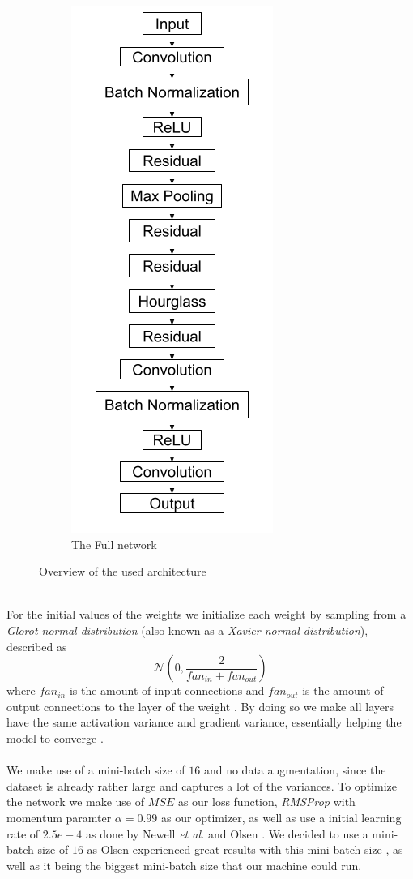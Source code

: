 \documentclass[./main.tex]{subfiles}
\begin{document}
\begin{figure}[p]
\begin{subfigure}{5 cm}
        \centering
        \includegraphics[width = 4 cm]{entities/SHG_drawing.png}
        \caption{The Full network}
    \end{subfigure}
    \caption{Overview of the used architecture}
    \label{fig:architecture}
\end{figure}
\\
For the initial values of the weights we initialize each weight by sampling from a \textit{Glorot normal distribution} (also known as a \textit{Xavier normal distribution}), described as
$$\mathcal{N} \left(0, \frac{2}{fan_{in} + fan_{out}} \right)$$
where $fan_{in}$ is the amount of input connections and $fan_{out}$ is the amount of output connections to the layer of the weight \cite{Xavier}. By doing so we make all layers have the same activation variance and gradient variance, essentially helping the model to converge \cite{DeepLearning}.
\\
\\
We make use of a mini-batch size of $16$ and no data augmentation, since the dataset is already rather large and captures a lot of the variances. To optimize the network we make use of $MSE$ as our loss function, \textit{RMSProp} with momentum paramter $\alpha = 0.99$ as our optimizer, as well as use a initial learning rate of $2.5e-4$ as done by Newell \textit{et al.} \cite{Newell} and Olsen \cite{Camilla}. We decided to use a mini-batch size of $16$ as Olsen experienced great results with this mini-batch size \cite{Camilla}, as well as it being the biggest mini-batch size that our machine could run.
\\
\end{document}
